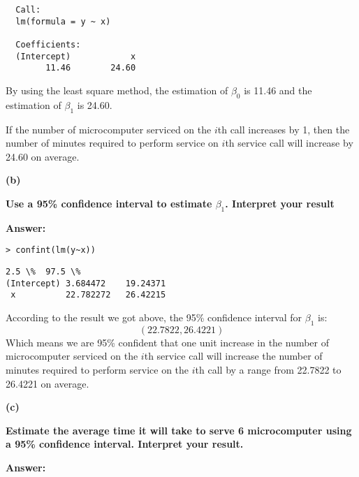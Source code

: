 \documentclass[letterpaper,11pt]{article}
\begin{document}
\begin{lstlisting}
  Call:
  lm(formula = y ~ x)

  Coefficients:
  (Intercept)            x
        11.46        24.60
\end{lstlisting}
By using the least square method, the estimation of $\beta_0$ is 11.46 and the estimation of $\beta_1$ is 24.60.\par
If the number of microcomputer serviced on the $i$th call increases by 1, then the number of minutes required to perform service on $i$th service call will increase by 24.60 on average.
  \bigbreak
  \begin{addmargin}[-1.1em]{0em}
  \textbf{(b)}\par\end{addmargin}
    \textbf{Use a 95\% confidence interval to estimate $\beta_1$. Interpret your result}\par
  \bigbreak
  \begin{addmargin}[-0.5em]{0em}
  \textbf{Answer: }\end{addmargin}

\begin{lstlisting}
> confint(lm(y~x))
\end{lstlisting}

\begin{lstlisting}
2.5 \%	97.5 \%
(Intercept)	3.684472	19.24371
 x	        22.782272	26.42215
\end{lstlisting}

According to the result we got above, the 95\% confidence interval for $\beta_1$ is:
$$(22.7822,26.4221)$$
Which means we are 95\% confident that one unit increase in the number of microcomputer serviced on the $i$th service call will increase the number of minutes required to perform service on the $i$th call by a range from 22.7822 to 26.4221 on average.

  \bigbreak
  \begin{addmargin}[-1.1em]{0em}
  \textbf{(c)}\par\end{addmargin}
    \textbf{Estimate the average time it will take to serve 6 microcomputer using a 95\% confidence interval. Interpret your result.}\par
\begin{addmargin}[-0.5em]{0em}
\textbf{Answer: }\end{addmargin}
\end{document}
